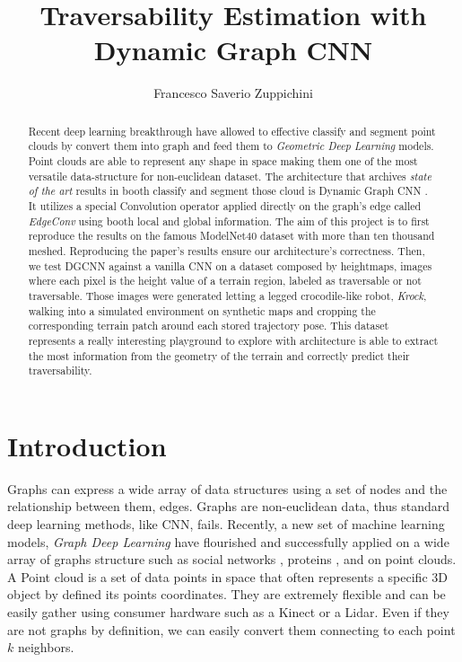 \documentclass[twocolumn,showpacs,%
  nofootinbib,aps,superscriptaddress,%
  eqsecnum,prd,notitlepage,showkeys,10pt]{revtex4-1}
\begin{document}
\title{Traversability Estimation with Dynamic Graph CNN}
\author{Francesco Saverio Zuppichini}
\begin{abstract}
  Recent deep learning breakthrough have allowed to effective classify and segment point clouds by convert them into graph and feed them to \emph{Geometric Deep Learning} models. Point clouds are able to represent any shape in space making them one of the most versatile data-structure for non-euclidean dataset. The architecture that archives \emph{state of the art} results in booth classify and segment those cloud is Dynamic Graph CNN \cite{dgcnn}. It utilizes a special Convolution operator applied directly on the graph's edge called \emph{EdgeConv} using booth local and global information. The aim of this project is to first reproduce the results on the famous ModelNet40 \cite{shapenet} dataset with more than ten thousand meshed. Reproducing the paper's results ensure our architecture's correctness.
  Then, we test DGCNN against a vanilla CNN on a dataset composed by heightmaps, images where each pixel is the height value of a terrain region, labeled as traversable or not traversable. Those images were generated letting a legged crocodile-like robot, \emph{Krock}, walking into a simulated environment on synthetic maps and cropping the corresponding terrain patch around each stored trajectory pose. This dataset represents a really interesting playground to explore with architecture is able to extract the most information from the geometry of the terrain and correctly predict their traversability. 
\end{abstract}
\maketitle
\section{Introduction}

Graphs can express a wide array of data structures using a set of nodes and the relationship between them, edges. Graphs are non-euclidean data, thus standard deep learning methods, like CNN, fails. Recently, a new set of machine learning models, \emph{Graph Deep Learning} have flourished and successfully applied on a wide array of graphs structure such as social networks , proteins , and on point clouds. A Point cloud is a set of data points in space that often represents a specific 3D object by defined its points coordinates. They are extremely flexible and can be easily gather using consumer hardware such as a Kinect or a Lidar. Even if they are not graphs by definition, we can easily convert them connecting to each point $k$ neighbors.
\end{document}
